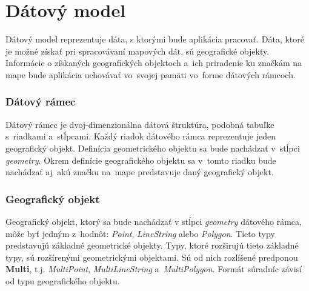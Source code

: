\section{Dátový model}
Dátový model reprezentuje dáta, s ktorými bude aplikácia pracovať. Dáta, ktoré je možné získať pri spracovávaní mapových dát, sú geografické objekty. Informácie o získaných geografických objektoch a~ich priradenie ku značkám na mape bude aplikácia uchovávať vo~svojej pamäti vo~forme dátových rámcoch.

\subsubsection{Dátový rámec}
Dátový rámec je dvoj-dimenzionálna dátová štruktúra, podobná tabuľke s~riadkami a~stĺpcami. Každý riadok dátového rámca reprezentuje jeden geografický objekt. Definícia geometrického objektu sa bude nachádzať v~stĺpci \emph{geometry}. Okrem definície geografického objektu sa v~tomto riadku bude nachádzať aj~akú značku na~mape predstavuje daný geografický objekt. 

\subsubsection{Geografický objekt}
Geografický objekt, ktorý sa bude nachádzať v stĺpci \emph{geometry} dátového rámca, môže byť jedným z~hodnôt: \emph{Point}, \emph{LineString} alebo \emph{Polygon}. Tieto typy predstavujú základné geometrické objekty. Typy, ktoré rozširujú tieto základné typy, sú rozšírenými geometrickými objektami. Sú od nich rozlíšené predponou \textbf{Multi}, t.j. \emph{MultiPoint}, \emph{MultiLineString} a~\emph{MultiPolygon}. Formát súradníc závisí od typu geografického objektu.


